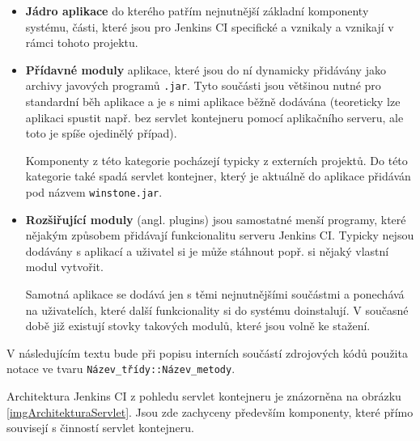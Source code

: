             \begin{itemize}
                \item{\textbf{Jádro aplikace} do kterého patřím nejnutnější základní komponenty systému,
                    části, které jsou pro Jenkins CI specifické a vznikaly a vznikají v rámci tohoto projektu.}

                \item{\textbf{Přídavné moduly} aplikace, které jsou do ní dynamicky přidávány jako archivy javových programů
                    \texttt{.jar}. Tyto součásti jsou většinou nutné pro standardní běh aplikace a je s nimi aplikace
                    běžně dodávána (teoreticky lze
                    aplikaci spustit např. bez servlet kontejneru pomocí aplikačního serveru, ale toto je spíše ojedinělý případ). 
                    
                    Komponenty z této kategorie pocházejí typicky z externích projektů.
                    Do této kategorie také spadá servlet kontejner, který je aktuálně do aplikace
                    přidáván pod názvem \texttt{winstone.jar}.}

                \item{\textbf{Rozšiřující moduly} (angl. plugins) jsou samostatné menší programy, které nějakým
                    způsobem přidávají funkcionalitu serveru Jenkins CI. Typicky nejsou dodávány s aplikací
                    a uživatel si je může stáhnout popř. si nějaký vlastní modul vytvořit.
                    
                    Samotná aplikace se dodává jen s těmi nejnutnějšími součástmi a ponechává na uživatelích, které
                    další funkcionality si do systému doinstalují. V současné době již existují stovky takových
                    modulů, které jsou volně ke stažení. }
            \end{itemize}
            

            V následujícím textu bude při popisu interních součástí zdrojových kódů použita notace
            ve tvaru \texttt{Název\_třídy::Název\_metody}.

            Architektura Jenkins CI z pohledu servlet kontejneru je znázorněna na obrázku \ref{imgArchitekturaServlet}.
            Jsou zde zachyceny především komponenty, které přímo souvisejí s činností servlet kontejneru.


